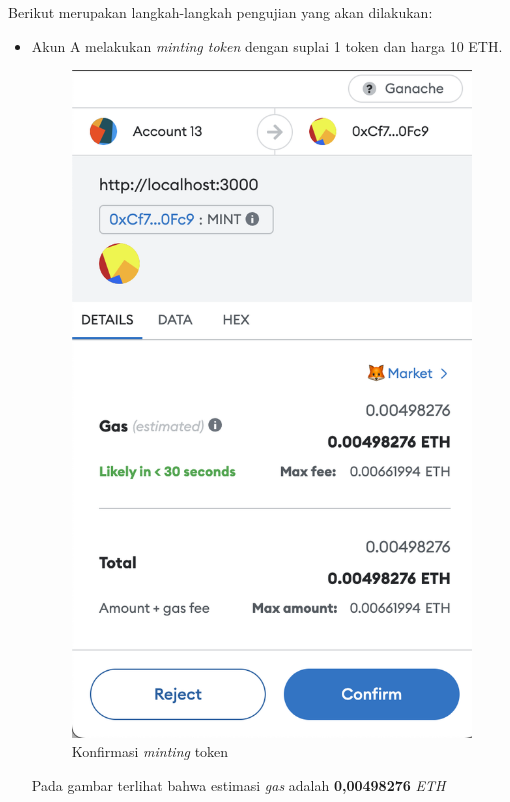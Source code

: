   Berikut merupakan langkah-langkah pengujian yang akan dilakukan:
  \begin{itemize}
      \item Akun A melakukan \emph{minting token} dengan suplai 1 token dan harga 10 ETH.
      \begin{figure} [H] \centering
          \includegraphics[scale=0.4]{gambar/img-test-share-mint-1.png}
          \caption{Konfirmasi \emph{minting} token}
          \label{fig:TestShareKonfirmasiMintingToken}
        \end{figure}
      Pada gambar terlihat bahwa estimasi \emph{gas} adalah \textbf{0,00498276} \emph{ETH}

\end{itemize}
